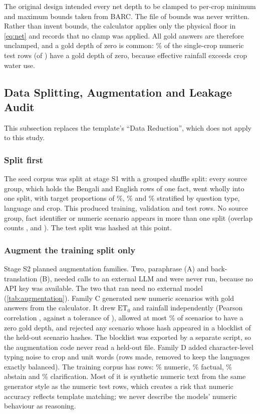 The original design intended every net depth to be clamped to per-crop minimum and maximum bounds taken from BARC. The file of bounds was never written. Rather than invent bounds, the calculator applies only the physical floor in \eqref{eq:net} and records that no clamp was applied. All gold answers are therefore unclamped, and a gold depth of zero is common: \ZeroGoldPct\% of the single-crop numeric test rows (\ZeroGoldN of \NumericSingle) have a gold depth of zero, because effective rainfall exceeds crop water use.

\subsection{Data Splitting, Augmentation and Leakage Audit}
\label{sec:splitting}

This subsection replaces the template's ``Data Reduction'', which does not apply to this study.

\subsubsection*{Split first}
The seed corpus was split at stage S1 with a grouped shuffle split: every source group, which holds the Bengali and English rows of one fact, went wholly into one split, with target proportions of \SplitRatioTrain\%, \SplitRatioVal\% and \SplitRatioTest\% stratified by question type, language and crop. This produced \TrainSeedRows training, \ValRows validation and \TestSeedRows test rows. No source group, fact identifier or numeric scenario appears in more than one split (overlap counts \SplitOverlapSource, \SplitOverlapFact and \SplitOverlapScenario). The test split was hashed at this point.

\subsubsection*{Augment the training split only}
Stage S2 planned \AugFamiliesPlanned augmentation families. Two, paraphrase (A) and back-translation (B), needed calls to an external LLM and were never run, because no API key was available. The two that ran need no external model (\cref{tab:augmentation}). Family C generated \AugRowsSynthetic new numeric scenarios with gold answers from the calculator. It drew $\mathrm{ET}_0$ and rainfall independently (Pearson correlation \AugPearsonR, against a tolerance of \AugPearsonTol), allowed at most \AugZeroQuotaPct\% of scenarios to have a zero gold depth, and rejected any scenario whose hash appeared in a blocklist of the \AugBlocklistHashes held-out scenario hashes. The blocklist was exported by a separate script, so the augmentation code never read a held-out file. Family D added character-level typing noise to crop and unit words (\AugNoiseMade rows made, \AugDropBalance removed to keep the languages exactly balanced). The training corpus has \AugRows rows: \TrainPctNumeric\% numeric, \TrainPctFactual\% factual, \TrainPctAbstain\% abstain and \TrainPctClarify\% clarification. Most of it is synthetic numeric text from the same generator style as the numeric test rows, which creates a risk that numeric accuracy reflects template matching; we never describe the models' numeric behaviour as reasoning.

